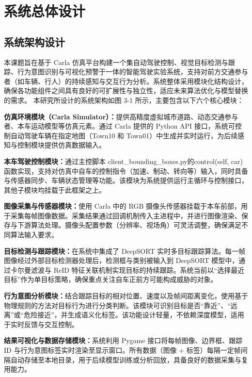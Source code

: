 \chapter{系统总体设计}

\section{系统架构设计}

本课题旨在基于 Carla 仿真平台构建一个集自动驾驶控制、视觉目标检测与跟踪、行为意图识别与可视化预警于一体的智能驾驶实验系统，支持对前方交通参与者（如车辆、行人）的持续感知与交互行为分析。系统整体采用模块化结构设计，确保各功能组件之间具有良好的可扩展性与独立性，适应未来算法优化与模型替换的需求。
本研究所设计的系统架构如图 3-1 所示，主要包含以下六个核心模块：

\textbf{仿真环境模块（Carla Simulator）：}提供高精度虚拟城市道路、动态交通参与者、本车运动模型等仿真元素。通过 Carla 提供的 Python API 接口，系统可控制自动驾驶车辆在指定地图（Town10 和 Town01）中生成并实时运行，为后续感知与控制模块提供仿真数据输入。

\textbf{本车驾驶控制模块：}通过主控脚本 client\_bounding\_boxes.py的control(self, car) 函数实现，支持对仿真中自车的控制指令（加速、制动、转向等）输入，同时具备与传感器同步、车辆状态管理等功能。该模块为系统提供运行主循环与控制接口，其他子模块均挂载于此框架之上。

\textbf{图像采集与传感器模块：}使用 Carla 中的 RGB 摄像头传感器挂载于本车前部，用于采集每帧图像数据。采集结果通过回调机制传入主进程中，并进行图像渲染、保存与下游算法处理。摄像头配置参数（分辨率、视场角）可灵活调整，确保满足不同算法输入要求。

\textbf{目标检测与跟踪模块：}在系统中集成了 DeepSORT 实时多目标跟踪算法。每一帧图像经过外部目标检测器处理后，检测框与类别被输入到 DeepSORT 模型中，通过卡尔曼滤波与 ReID 特征关联机制实现目标的持续跟踪。系统当前以“选择最近目标”作为单目标策略，确保重点关注自车正前方可能构成威胁的对象。

\textbf{行为意图分析模块：}结合跟踪目标的相对位置、速度以及帧间距离变化，使用基于物理规则的方法对目标行为进行分类判断。该模块可识别目标是否“靠近”、“远离”或“危险接近”，并生成语义化标签。该功能设计轻量，不依赖深度模型，适用于实时反馈与交互控制。

\textbf{结果可视化与数据存储模块：}系统利用 Pygame 接口将每帧图像、边界框、跟踪 ID 与行为意图标签实时渲染至显示窗口。所有数据（图像 + 标签）每隔一定帧间隔自动存储至本地目录，用于后续模型训练或分析回放，具备良好的数据采集与复用能力。

